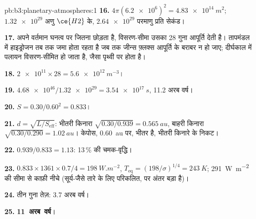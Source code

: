 \begin{solution}{pb:b3:planetary-atmospheres:1}
\textbf{16.} $4\pi(\num{6.2e6})^2 = \qty{4.83e14}{m^2}$; $\num{1.32e29}$ अणु
$\ce{H2}$ के, $\num{2.64e29}$ परमाणु प्रति सेकंड।

\textbf{17.}  अपने वर्तमान घनत्व पर जितना छोड़ता है, विसरण-सीमा उसका
28 गुना आपूर्ति देती है। तापमंडल में हाइड्रोजन तब तक जमा होता रहता है
जब तक जीन्स फ़्लक्स आपूर्ति के बराबर न हो जाए; दीर्घकाल में पलायन विसरण-सीमित
हो जाता है, जैसा पृथ्वी पर होता है।

\textbf{18.} $\num{2e11}\times28 = \qty{5.6e12}{m^{-3}}$।

\textbf{19.} $\num{4.68e46}/\num{1.32e29} = \qty{3.54e17}{s}$, 11.2 अरब वर्ष।

\textbf{20.} $S = 0.30/0.60^2 = 0.833$।

\textbf{21.} $d = \sqrt{L/S_\mathrm{eff}}$: भीतरी किनारा $\sqrt{0.30/0.939} =
\qty{0.565}{au}$, बाहरी किनारा $\sqrt{0.30/0.290} = \qty{1.02}{au}$। केपोस,
\qty{0.60}{au} पर, भीतर है, भीतरी किनारे के निकट।

\textbf{22.} $0.939/0.833 = 1.13$: 13\,\% की चमक-वृद्धि।

\textbf{23.} $0.833\times1361\times0.7/4 = \qty{198}{W.m^{-2}}$, $T_\mathrm{eq} =
(198/\sigma)^{1/4} = \qty{243}{K}$; \qty{291}{W.m^{-2}} की सीमा से काफ़ी नीचे
(सूर्य-जैसे तारे के लिए परिकलित,
पर अंतर बड़ा है)।

\textbf{24.} तीन गुना तेज़: 3.7 अरब वर्ष।

\textbf{25.} \textbf{11~अरब~वर्ष}।
\end{solution}
